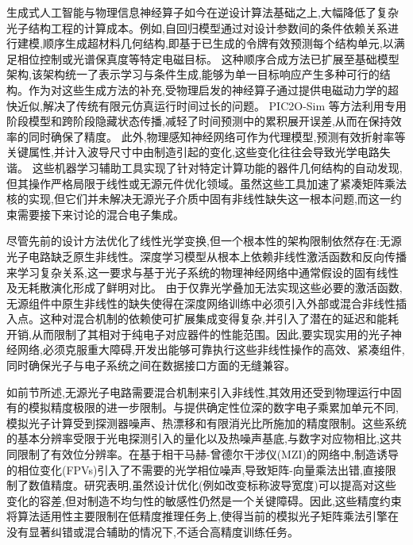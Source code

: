 生成式人工智能与物理信息神经算子如今在逆设计算法基础之上,大幅降低了复杂光子结构工程的计算成本。例如,自回归模型通过对设计参数间的条件依赖关系进行建模,顺序生成超材料几何结构,即基于已生成的令牌有效预测每个结构单元,以满足相位控制或光谱保真度等特定电磁目标。\citep{doi_10_48550_arxiv_2507_06853_b7161f49} 这种顺序合成方法已扩展至基础模型架构,该架构统一了表示学习与条件生成,能够为单一目标响应产生多种可行的结构。作为对这些生成方法的补充,受物理启发的神经算子通过提供电磁动力学的超快近似,解决了传统有限元仿真运行时间过长的问题。\citep{doi_10_1016_j_compositesb_2025_112935_31ebab19} PIC2O-Sim 等方法利用专用阶段模型和跨阶段隐藏状态传播,减轻了时间预测中的累积展开误差,从而在保持效率的同时确保了精度。\citep{doi_10_48550_arxiv_2406_17810_813bd2a3} 此外,物理感知神经网络可作为代理模型,预测有效折射率等关键属性,并计入波导尺寸中由制造引起的变化,这些变化往往会导致光学电路失谐。\citep{doi_10_1007_s11082_024_08009_8_0f7f241e} 这些机器学习辅助工具实现了针对特定计算功能的器件几何结构的自动发现,但其操作严格局限于线性或无源元件优化领域。虽然这些工具加速了紧凑矩阵乘法核的实现,但它们并未解决无源光子介质中固有非线性缺失这一根本问题,而这一约束需要接下来讨论的混合电子集成。\citep{doi_10_1109_access_2026_3697666_bd5258a6} \citep{doi_10_48550_arxiv_2406_17810_813bd2a3} \citep{doi_10_1007_s11082_024_08009_8_0f7f241e} \citep{doi_10_1063_5_0159264_6f483b1f}

尽管先前的设计方法优化了线性光学变换,但一个根本性的架构限制依然存在:无源光子电路缺乏原生非线性。深度学习模型从根本上依赖非线性激活函数和反向传播来学习复杂关系,这一要求与基于光子系统的物理神经网络中通常假设的固有线性及无耗散演化形成了鲜明对比。\citep{doi_10_1002_adma_202522820_5596700a} 由于仅靠光学叠加无法实现这些必要的激活函数,无源组件中原生非线性的缺失使得在深度网络训练中必须引入外部或混合非线性插入点。这种对混合机制的依赖使可扩展集成变得复杂,并引入了潜在的延迟和能耗开销,从而限制了其相对于纯电子对应器件的性能范围。因此,要实现实用的光子神经网络,必须克服重大障碍,开发出能够可靠执行这些非线性操作的高效、紧凑组件,同时确保光子与电子系统之间在数据接口方面的无缝兼容。\citep{doi_10_1038_s41586_021_04223_6_6158a5ea} \citep{doi_10_1515_nanoph_2019_0474_d2187501} \citep{doi_10_3390_nano14080697_c372a140}

如前节所述,无源光子电路需要混合机制来引入非线性,其效用还受到物理运行中固有的模拟精度极限的进一步限制。与提供确定性位深的数字电子乘累加单元不同,模拟光子计算受到探测器噪声、热漂移和有限消光比所施加的精度限制。这些系统的基本分辨率受限于光电探测引入的量化以及热噪声基底,与数字对应物相比,这共同限制了有效位分辨率。在基于相干马赫-曾德尔干涉仪(MZI)的网络中,制造诱导的相位变化(FPVs)引入了不需要的光学相位噪声,导致矩阵-向量乘法出错,直接限制了数值精度。研究表明,虽然设计优化(例如改变标称波导宽度)可以提高对这些变化的容差,但对制造不均匀性的敏感性仍然是一个关键障碍。因此,这些精度约束将算法适用性主要限制在低精度推理任务上,使得当前的模拟光子矩阵乘法引擎在没有显著纠错或混合辅助的情况下,不适合高精度训练任务。\citep{doi_10_3390_nano14080697_c372a140} \citep{doi_10_3390_nano14080697_c372a140} \citep{doi_10_1109_tnano_2022_3223915_d4da3e6b} \citep{doi_10_1515_nanoph_2022_0423_38a2c3ec}

